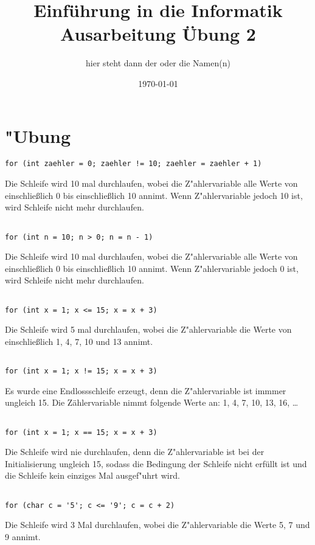 \documentclass[a4paper,11pt,titlepage]{article}
\begin{document}
\title{Einf\"uhrung in die Informatik\\
Ausarbeitung \"Ubung 2}


\author{hier steht dann der oder die Namen(n)}


\date{\today}

\maketitle{\thispagestyle{plain}}

\section{"Ubung}
\begin{verbatim}
for (int zaehler = 0; zaehler != 10; zaehler = zaehler + 1)
\end{verbatim}
Die Schleife wird 10 mal durchlaufen, wobei die Z"ahlervariable alle Werte von einschließlich 0 bis einschließlich 10 annimt. Wenn Z"ahlervariable jedoch 10 ist, wird Schleife nicht mehr durchlaufen.
\begin{verbatim}

for (int n = 10; n > 0; n = n - 1)
\end{verbatim}
Die Schleife wird 10 mal durchlaufen, wobei die Z"ahlervariable alle Werte von einschließlich 0 bis einschließlich 10 annimt. Wenn Z"ahlervariable jedoch 0 ist, wird Schleife nicht mehr durchlaufen.
\begin{verbatim}

for (int x = 1; x <= 15; x = x + 3)
\end{verbatim}
Die Schleife wird 5 mal durchlaufen, wobei die Z"ahlervariable die Werte von einschließlich 1, 4, 7, 10 und 13 annimt.
\begin{verbatim}

for (int x = 1; x != 15; x = x + 3)
\end{verbatim}
Es wurde eine Endlossschleife erzeugt, denn die Z"ahlervariable ist immmer ungleich 15. Die Zählervariable nimmt folgende Werte an: 1, 4, 7, 10, 13, 16, \dots
\begin{verbatim}

for (int x = 1; x == 15; x = x + 3)
\end{verbatim}
Die Schleife wird nie durchlaufen, denn die Z"ahlervariable ist bei der Initialisierung ungleich 15, sodass die Bedingung der Schleife nicht erfüllt ist und die Schleife kein einziges Mal ausgef"uhrt wird.
\begin{verbatim}

for (char c = '5'; c <= '9'; c = c + 2)
\end{verbatim}
Die Schleife wird 3 Mal durchlaufen, wobei die Z"ahlervariable die Werte 5, 7 und 9 annimt.\newpage
\end{document}
